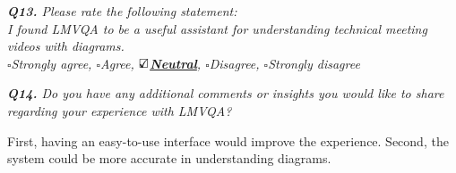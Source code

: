 \vspace*{1em}\noindent\textit{\textbf{Q13.} Please rate the following statement:
\\[.5em]
\textit{I found LMVQA to be a useful assistant for understanding technical meeting videos with diagrams.}
\\[.5em]
\indent $\square$Strongly agree,
$\square$Agree,
\underline{\bfseries$\text{\rlap{$\checkmark$}}\square$Neutral},
$\square$Disagree,
$\square$Strongly disagree
}

\vspace*{1em}

\noindent\textit{\textbf{Q14.} Do you have any additional comments or insights you would like to share regarding your experience with LMVQA?
}

\begin{samepage}
\begin{mdframed}[style=MyFrame]
First, having an easy-to-use interface would improve the experience. Second, the system could be more accurate in understanding diagrams.
\end{mdframed}
\end{samepage}
